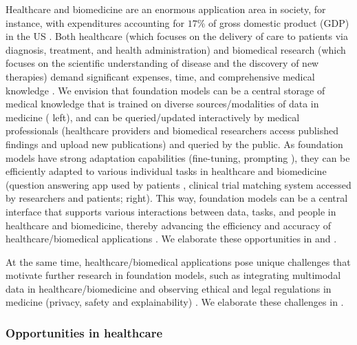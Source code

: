 Healthcare and biomedicine are an enormous application area in society, for instance, with expenditures accounting for $17$\% of gross domestic product (GDP) in the US \citep{swensen2011controlling,van_Hartskamp_2019,keehan2020national}.
Both healthcare (which focuses on the delivery of care to patients via diagnosis, treatment, and health administration) and biomedical research (which focuses on the scientific understanding of disease and the discovery of new therapies) demand significant expenses, time, and comprehensive medical knowledge \citep{yu2018artificial,korngiebel2021considering}.
We envision that foundation models can be a central storage of medical knowledge that is trained on diverse sources/modalities of data in medicine \citep{krumholz2016data,soltanian2019multimodal,suresh2020deep} ( left), and can be queried/updated interactively by medical professionals (\eg healthcare providers and biomedical researchers access published findings and upload new publications) \citep{ionescu2020deep} and queried by the public. 
As foundation models have strong adaptation capabilities (\eg fine-tuning, prompting \citep{brown2020gpt3}), they can be efficiently adapted to various individual tasks in healthcare and biomedicine (\eg question answering app used by patients \citep{klasnja2012healthcare, zhu2019hierarchical,daniel2019towards,liu2020interpretable}, clinical trial matching system \citep{ni2015automated,harrer2019artificial,beck2020artificial} accessed by researchers and patients;  right).
This way, foundation models can be a central interface that supports various interactions between data, tasks, and people in healthcare and biomedicine, thereby advancing the efficiency and accuracy of healthcare/biomedical applications \citep{elbattah2021role}. 
We elaborate these opportunities in  and .

At the same time, healthcare/biomedical applications pose unique challenges that motivate further research in foundation models, such as integrating multimodal data in healthcare/biomedicine \citep{miura2020improving,fenglincompetence2021} and observing ethical and legal regulations in medicine (privacy, safety and explainability) \citep{guan2019artificial,xu2019translating}. We elaborate these challenges in .


\subsubsection{Opportunities in healthcare}
\label{sec:healthcare-tasks}

